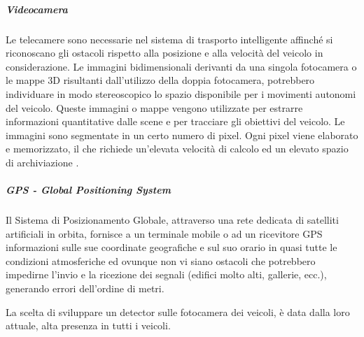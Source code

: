 \documentclass[14pt]{extarticle}
\begin{document}
\subparagraph{Videocamera}
Le telecamere sono necessarie nel sistema di trasporto intelligente affinché si riconoscano gli ostacoli rispetto alla posizione e alla velocità del
veicolo in considerazione. Le immagini bidimensionali derivanti da una
singola fotocamera o le mappe 3D risultanti dall'utilizzo della doppia
fotocamera, potrebbero individuare in modo stereoscopico lo spazio disponibile per i movimenti autonomi del veicolo. Queste immagini o mappe
vengono utilizzate per estrarre informazioni quantitative dalle scene e
per tracciare gli obiettivi del veicolo. Le immagini sono segmentate in un
certo numero di pixel. Ogni pixel viene elaborato e memorizzato, il che richiede un'elevata velocità di calcolo ed un elevato spazio di archiviazione
\cite{das2018risk}.

\subparagraph{GPS - Global Positioning System}
Il Sistema di Posizionamento Globale, attraverso una rete dedicata di satelliti artificiali in orbita, fornisce a un terminale mobile o ad un ricevitore
GPS informazioni sulle sue coordinate geografiche e sul suo orario in
quasi tutte le condizioni atmosferiche ed ovunque non vi siano ostacoli
che potrebbero impedirne l'invio e la ricezione dei segnali (edifici molto
alti, gallerie, ecc.), generando errori dell'ordine di metri.

La scelta di sviluppare un detector sulle fotocamera dei veicoli, è data dalla loro  attuale, alta presenza in tutti i veicoli.
\end{document}
